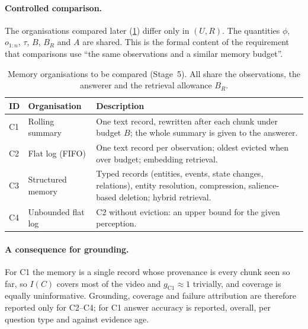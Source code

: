 \paragraph{Controlled comparison.}
The organisations compared later (\cref{tab:conditions}) differ only in
$(U,R)$. The quantities $\phi$, $o_{1:n}$, $\tau$, $B$, $B_R$ and $A$ are
shared. This is the formal content of the requirement that comparisons use
``the same observations and a similar memory budget''.

\begin{table}[ht]
\centering\small
\caption{Memory organisations to be compared (Stage~5). All share the
observations, the answerer and the retrieval allowance $B_R$.}
\label{tab:conditions}
\begin{tabularx}{\linewidth}{@{}llX@{}}
\toprule
ID & Organisation & Description \\
\midrule
C1 & Rolling summary & One text record, rewritten after each chunk under
  budget $B$; the whole summary is given to the answerer. \\
C2 & Flat log (FIFO) & One text record per observation; oldest evicted when
  over budget; embedding retrieval. \\
C3 & Structured memory & Typed records (entities, events, state changes,
  relations), entity resolution, compression, salience-based deletion;
  hybrid retrieval. \\
C4 & Unbounded flat log & C2 without eviction: an upper bound for the given
  perception. \\
\bottomrule
\end{tabularx}
\end{table}

\paragraph{A consequence for grounding.}
For C1 the memory is a single record whose provenance is every chunk seen so
far, so $I(C)$ covers most of the video and $g_{\mathrm{C1}}\approx 1$
trivially, and coverage is equally uninformative. Grounding, coverage and failure
attribution are therefore reported only for C2--C4; for C1 answer accuracy is
reported, overall, per question type and against evidence age.
